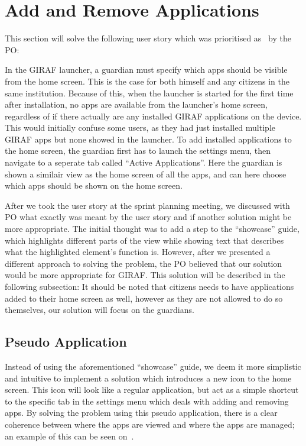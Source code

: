 \section{Add and Remove Applications}
\label{sec:add_and_remove_applications}
This section will solve the following user story which was prioritised as \pmedhigh~by the PO:

In the GIRAF launcher, a guardian must specify which apps should be visible from the home screen.
This is the case for both himself and any citizens in the same institution.
Because of this, when the launcher is started for the first time after installation, no apps are available from the launcher's home screen, regardless of if there actually are any installed GIRAF applications on the device.
This would initially confuse some users, as they had just installed multiple GIRAF apps but none showed in the launcher.
To add installed applications to the home screen, the guardian first has to launch the settings menu, then navigate to a seperate tab called \enquote{Active Applications}.
Here the guardian is shown a similair view as the home screen of all the apps, and can here choose which apps should be shown on the home screen.

After we took the user story at the sprint planning meeting, we discussed with PO what exactly was meant by the user story and if another solution might be more appropriate.
The initial thought was to add a step to the \enquote{showcase} guide, which highlights different parts of the view while showing text that describes what the highlighted element's function is.
However, after we presented a different approach to solving the problem, the PO believed that our solution would be more appropriate for GIRAF.
This solution will be described in the following subsection:
It should be noted that citizens needs to have applications added to their home screen as well, however as they are not allowed to do so themselves, our solution will focus on the guardians.

\subsection{Pseudo Application}
\label{sub:pseudo_application}
Instead of using the aforementioned \enquote{showcase} guide, we deem it more simplistic and intuitive to implement a solution which introduces a new icon to the home screen.
This icon will look like a regular application, but act as a simple shortcut to the specific tab in the settings menu which deals with adding and removing apps.
By solving the problem using this pseudo application, there is a clear coherence between where the apps are viewed and where the apps are managed; an example of this can be seen on~.

